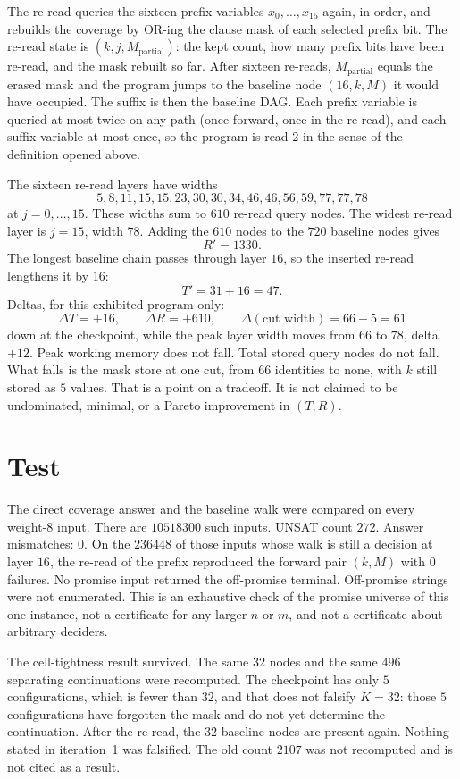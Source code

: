 \documentclass[11pt]{article}
\begin{document}
The re-read queries the sixteen prefix variables \(x_0,\ldots,x_{15}\) again, in order, and rebuilds the coverage by OR-ing the clause mask of each selected prefix bit.
The re-read state is \((k, j, M_{\mathrm{partial}})\): the kept count, how many prefix bits have been re-read, and the mask rebuilt so far.
After sixteen re-reads, \(M_{\mathrm{partial}}\) equals the erased mask and the program jumps to the baseline node \((16, k, M)\) it would have occupied.
The suffix is then the baseline DAG.
Each prefix variable is queried at most twice on any path (once forward, once in the re-read), and each suffix variable at most once, so the program is read-\(2\) in the sense of the definition opened above.

The sixteen re-read layers have widths
\[
5,8,11,15,15,23,30,30,34,46,46,56,59,77,77,78
\]
at \(j=0,\ldots,15\).
These widths sum to \(610\) re-read query nodes.
The widest re-read layer is \(j=15\), width \(78\).
Adding the \(610\) nodes to the \(720\) baseline nodes gives
\[
R'=1330.
\]
The longest baseline chain passes through layer \(16\), so the inserted re-read lengthens it by \(16\):
\[
T'=31+16=47.
\]
Deltas, for this exhibited program only:
\[
\Delta T=+16,\qquad \Delta R=+610,\qquad \Delta(\text{cut width})=66-5=61
\]
down at the checkpoint, while the peak layer width moves from \(66\) to \(78\), delta \(+12\).
Peak working memory does not fall.
Total stored query nodes do not fall.
What falls is the mask store at one cut, from \(66\) identities to none, with \(k\) still stored as \(5\) values.
That is a point on a tradeoff.
It is not claimed to be undominated, minimal, or a Pareto improvement in \((T,R)\).

\section{Test}
The direct coverage answer and the baseline walk were compared on every weight-\(8\) input.
There are \(10518300\) such inputs.
UNSAT count \(272\).
Answer mismatches: \(0\).
On the \(236448\) of those inputs whose walk is still a decision at layer \(16\), the re-read of the prefix reproduced the forward pair \((k, M)\) with \(0\) failures.
No promise input returned the off-promise terminal.
Off-promise strings were not enumerated.
This is an exhaustive check of the promise universe of this one instance, not a certificate for any larger \(n\) or \(m\), and not a certificate about arbitrary deciders.

The cell-tightness result survived.
The same \(32\) nodes and the same \(496\) separating continuations were recomputed.
The checkpoint has only \(5\) configurations, which is fewer than \(32\), and that does not falsify \(K=32\): those \(5\) configurations have forgotten the mask and do not yet determine the continuation.
After the re-read, the \(32\) baseline nodes are present again.
Nothing stated in iteration~1 was falsified.
The old count \(2107\) was not recomputed and is not cited as a result.
\end{document}
